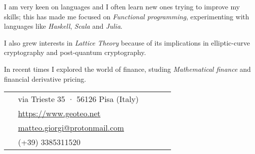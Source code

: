 \documentclass[10pt]{article} %
\begin{document}
\begin{paracol}{2}
I am very keen on languages and I often learn new ones trying to improve my skills; this has made me focused on \textit{Functional programming}, experimenting with languages like \textit{Haskell}, \textit{Scala} and \textit{Julia}.

\medskip
I also grew interests in \textit{Lattice Theory} because of its implications in elliptic-curve cryptography and post-quantum cryptography.

\medskip
In recent times I explored the world of finance, studing \textit{Mathematical finance} and financial derivative pricing.





\switchcolumn %


\parbox[top][0.12\textheight][c]{\linewidth}{ %
	\vspace{-0.04\textheight} %
	\colorbox{shade}{ %
		\begin{supertabular}{p{0.05\linewidth}|p{0.775\linewidth}} %
			\raisebox{-1pt}{\faHome} & via Trieste 35 · 56126 Pisa (Italy) \\ %
			\raisebox{-1pt}{\small\faDesktop} & \href{https://www.geoteo.net}{https://www.geoteo.net} \\ %
			\raisebox{0pt}{\small\faEnvelope} & \href{mailto:matteo.giorgi@protonmail.com}{matteo.giorgi@protonmail.com} \\ %
			\raisebox{-1pt}{\faPhoneSquare} & (+39) 3385311520 \\ %
		\end{supertabular}
	}
}


\end{paracol}
\end{document}
